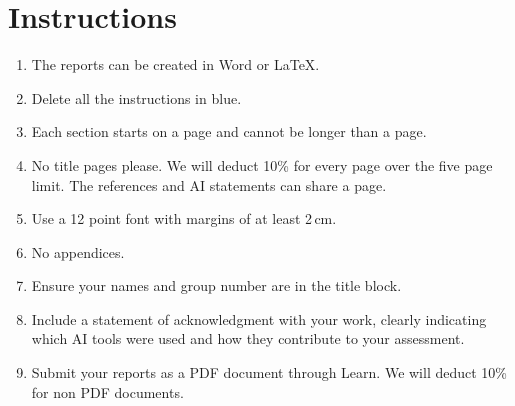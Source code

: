 \documentclass[a4paper,12pt]{article}
\begin{document}
\section*{Instructions}

\begin{enumerate}
\item The reports can be created in Word or \LaTeX.

\item Delete all the instructions in blue.

\item Each section starts on a page and cannot be longer than a page.

\item No title pages please.  We will deduct 10\% for every page over
  the five page limit.  The references and AI statements can share a
  page.

\item Use a 12 point font with margins of at least 2\,cm.

\item No appendices.

\item Ensure your names and group number are in the title block.

\item Include a statement of acknowledgment with your work, clearly
  indicating which AI tools were used and how they contribute to your
  assessment.

\item Submit your reports as a PDF document through Learn.  We will
  deduct 10\% for non PDF documents.

\end{enumerate}
\end{document}
